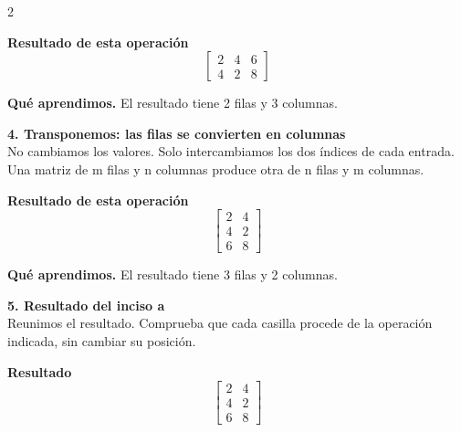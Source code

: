 \documentclass[11pt,a4paper,landscape]{article}
\begin{document}
\begin{multicols*}{2}
\begin{minipage}{\linewidth}
\par\smallskip \textbf{Resultado de esta operación}\[\begin{bmatrix}2 & 4 & 6\\4 & 2 & 8\end{bmatrix}\]
\par\smallskip\textbf{Qué aprendimos.} El resultado tiene 2 filas y 3 columnas.
\end{minipage}\par\medskip
\noindent\begin{minipage}{\linewidth}\textbf{4. Transponemos: las filas se convierten en columnas}\\[2pt]No cambiamos los valores. Solo intercambiamos los dos índices de cada entrada. Una matriz de m filas y n columnas produce otra de n filas y m columnas.
\par{}\par\smallskip
\par\smallskip \textbf{Resultado de esta operación}\[\begin{bmatrix}2 & 4\\4 & 2\\6 & 8\end{bmatrix}\]
\par\smallskip\textbf{Qué aprendimos.} El resultado tiene 3 filas y 2 columnas.
\end{minipage}\par\medskip
\noindent\begin{minipage}{\linewidth}\textbf{5. Resultado del inciso a}\\[2pt]Reunimos el resultado. Comprueba que cada casilla procede de la operación indicada, sin cambiar su posición.
\par\smallskip \textbf{Resultado}\[\begin{bmatrix}2 & 4\\4 & 2\\6 & 8\end{bmatrix}\]

\end{minipage}
\end{multicols*}
\end{document}
